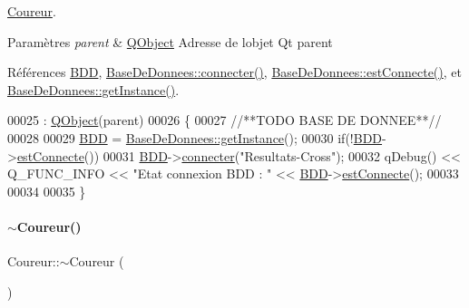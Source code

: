 \hyperlink{class_coureur}{Coureur}. 


\begin{DoxyParams}{Paramètres}
{\em parent} & \hyperlink{class_q_object}{Q\+Object} Adresse de l\textquotesingle{}objet Qt parent \\
\hline
\end{DoxyParams}


Références \hyperlink{class_coureur_a9890c210d97e593644b22cb0e8228527}{B\+DD}, \hyperlink{class_base_de_donnees_ab2e092285ccc0ee1cce61a1774218561}{Base\+De\+Donnees\+::connecter()}, \hyperlink{class_base_de_donnees_a00388973f3ec42e5c8e76e7af7e124b2}{Base\+De\+Donnees\+::est\+Connecte()}, et \hyperlink{class_base_de_donnees_a80028aa2b6b4fbf30fb2e36357b7d3d3}{Base\+De\+Donnees\+::get\+Instance()}.


\begin{DoxyCode}
00025                                 : \hyperlink{class_q_object}{QObject}(parent)
00026 \{
00027     \textcolor{comment}{//**TODO BASE DE DONNEE**//}
00028 
00029     \hyperlink{class_coureur_a9890c210d97e593644b22cb0e8228527}{BDD} = \hyperlink{class_base_de_donnees_a80028aa2b6b4fbf30fb2e36357b7d3d3}{BaseDeDonnees::getInstance}();
00030     \textcolor{keywordflow}{if}(!\hyperlink{class_coureur_a9890c210d97e593644b22cb0e8228527}{BDD}->\hyperlink{class_base_de_donnees_a00388973f3ec42e5c8e76e7af7e124b2}{estConnecte}())
00031         \hyperlink{class_coureur_a9890c210d97e593644b22cb0e8228527}{BDD}->\hyperlink{class_base_de_donnees_ab2e092285ccc0ee1cce61a1774218561}{connecter}(\textcolor{stringliteral}{"Resultats-Cross"});
00032     qDebug() << Q\_FUNC\_INFO << \textcolor{stringliteral}{"Etat connexion BDD : "} << \hyperlink{class_coureur_a9890c210d97e593644b22cb0e8228527}{BDD}->\hyperlink{class_base_de_donnees_a00388973f3ec42e5c8e76e7af7e124b2}{estConnecte}();
00033 
00034 
00035 \}
\end{DoxyCode}
\mbox{\label{class_coureur_acbaa69246e4da18c0951f651f9ab3d69}} 
\paragraph{\texorpdfstring{$\sim$\+Coureur()}{~Coureur()}}
{\footnotesize\ttfamily Coureur\+::$\sim$\+Coureur (\begin{DoxyParamCaption}{ }\end{DoxyParamCaption})}


